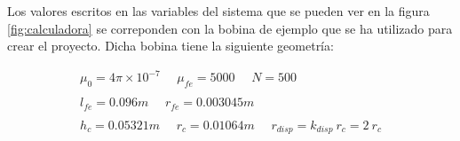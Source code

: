 Los valores escritos en las variables del sistema que se pueden ver en la figura \ref{fig:calculadora} se correponden con la bobina de ejemplo que se ha utilizado para crear el proyecto. Dicha bobina tiene la siguiente geometría:

\[
\begin{array}{c}
    \mu_0 = 4\pi \times 10^{-7}~~~~~~\mu_{fe} = 5000~~~~~~N = 500 \\~\\
    l_{fe} = 0.096m~~~~~~r_{fe} = 0.003045m \\~\\
    h_c = 0.05321m~~~~~~r_{c} = 0.01064m~~~~~~r_{disp} = k_{disp}~r_{c}=2~r_{c}
\end{array}
\]